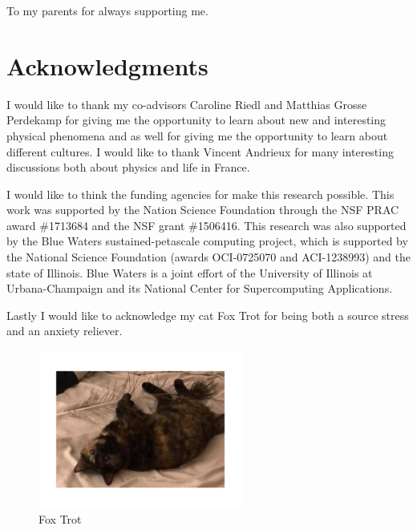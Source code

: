 \documentclass[edeposit,fullpage]{Classes/uiucthesis2009}
\begin{document}
\begin{dedication}
To my parents for always supporting me.
\end{dedication}

\chapter*{Acknowledgments}
I would like to thank my co-advisors Caroline Riedl and Matthias Grosse
Perdekamp for giving me the opportunity to learn about new and interesting
physical phenomena and as well for giving me the opportunity to learn about
different cultures.  I would like to thank Vincent Andrieux for many interesting
discussions both about physics and life in France.

I would like to think the funding agencies for make this research possible.
This work was supported by the Nation Science Foundation through the NSF PRAC
award \#1713684 and the NSF grant \#1506416.  This research was also supported
by the Blue Waters sustained-petascale computing project, which is supported by
the National Science Foundation (awards OCI-0725070 and ACI-1238993) and the
state of Illinois. Blue Waters is a joint effort of the University of Illinois
at Urbana-Champaign and its National Center for Supercomputing Applications.

Lastly I would like to acknowledge my cat Fox Trot for being both a source
stress and an anxiety reliever.
\begin{figure}[h!t]
  \centering
  \includegraphics[width=0.6\textwidth,trim=2cm 4cm 2cm 4cm,clip]{fox}
  \caption{Fox Trot}
  \label{fig::fox}
\end{figure}


\tableofcontents
\listoftables
\listoffigures
\end{document}
